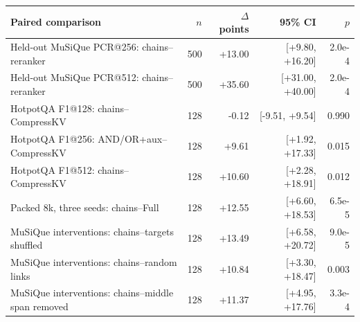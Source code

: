 \begin{tabular}{@{}p{}rrrr@{}}
\toprule
Paired comparison & $n$ & $\Delta$ points & 95\% CI & $p$ \\
\midrule
Held-out MuSiQue PCR@256: chains--reranker & 500 & +13.00 & [+9.80, +16.20] & 2.0e-4 \\
Held-out MuSiQue PCR@512: chains--reranker & 500 & +35.60 & [+31.00, +40.00] & 2.0e-4 \\
HotpotQA F1@128: chains--CompressKV & 128 & -0.12 & [-9.51, +9.54] & 0.990 \\
HotpotQA F1@256: AND/OR+aux--CompressKV & 128 & +9.61 & [+1.92, +17.33] & 0.015 \\
HotpotQA F1@512: chains--CompressKV & 128 & +10.60 & [+2.28, +18.91] & 0.012 \\
Packed 8k, three seeds: chains--Full & 128 & +12.55 & [+6.60, +18.53] & 6.5e-5 \\
MuSiQue interventions: chains--targets shuffled & 128 & +13.49 & [+6.58, +20.72] & 9.0e-5 \\
MuSiQue interventions: chains--random links & 128 & +10.84 & [+3.30, +18.47] & 0.003 \\
MuSiQue interventions: chains--middle span removed & 128 & +11.37 & [+4.95, +17.76] & 3.3e-4 \\
\bottomrule
\end{tabular}
